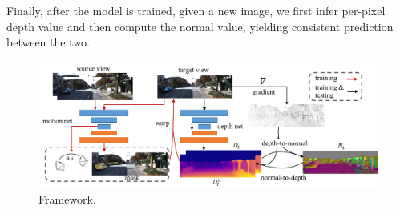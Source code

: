 Finally, after the model is trained, given a new image,  we first infer per-pixel depth value and then compute the normal value, yielding consistent prediction between the two.


\begin{figure}
\centering
\includegraphics[width=\textwidth]{figures/pipeline.pdf}
\caption{Framework.}
\label{fig:pipeline}
\end{figure}



